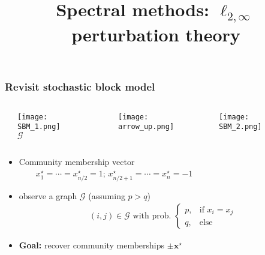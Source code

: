 \documentclass[compress,
mathserif,wide,%
]{beamer}
\title %
{Spectral methods: $\ell_{2,\infty}$ perturbation theory}
\begin{document}
\begin{frame}[plain]
  \titlepage

\end{frame}








\begin{frame}
	\frametitle{Revisit stochastic block model}

\vspace{-1em}


\begin{columns}

\begin{column}{0.05\textwidth}
\end{column}


\begin{column}{0.25\textwidth}
\begin{center}
  \texttt{[image: SBM\_1.png]} \\
	$\mathcal{G}$
\end{center}
\end{column}

\begin{column}{0.05\textwidth}
\end{column}


\begin{column}{0.12\textwidth}
\begin{center}
\texttt{[image: arrow\_up.png]} 
\end{center}
\end{column}


\begin{column}{0.5\textwidth}
\begin{center}
  \texttt{[image: SBM\_2.png]}
\end{center}
\end{column}

\begin{column}{0.03\textwidth}
\end{column}

\end{columns}


\bigskip


\begin{itemize}
	\itemsep0.5em
	\item Community membership vector \\
	$\qquad x_1^{\star}=\cdots=x_{n/2}^{\star}=1$; $x_{n/2+1}^{\star}=\cdots=x_n^{\star}=-1$ 
	\item observe a graph $\mathcal{G}$ (assuming $p>q$)
		\vspace{-0.5em}
		\begin{align*}
			(i,j)\in \mathcal{G} \text{ with prob.~} \begin{cases} p,  & \text{if }x_i = x_j \\ q, & \text{else} \end{cases}
		\end{align*}
	\item {\bf Goal:}  recover community memberships $\pm \bm{x}^\star$ 
\end{itemize}


\end{frame}
\end{document}
